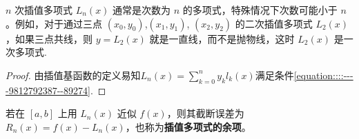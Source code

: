 \documentclass[../../main.tex]{subfiles}
\begin{document}
\begin{remark}
$n$ 次插值多项式 $L_n(x)$ 通常是次数为 $n$ 的多项式，特殊情况下次数可能小于 $n$。例如，对于通过三点 $(x_0, y_0)$,$ (x_1, y_1)$, $(x_2, y_2)$ 的二次插值多项式 $L_2(x)$，如果三点共线，则 $y = L_2(x)$ 就是一直线，而不是抛物线，这时 $L_2(x)$ 是一次多项式.
\end{remark}
\begin{proof}
由插值基函数的定义易知$L_n(x) = \sum_{k = 0}^n y_k l_k(x)$满足条件\eqref{equation::::----9812792387--89274}.
\end{proof}

\begin{definition}
若在 $[a, b]$ 上用 $L_n(x)$ 近似 $f(x)$，则其截断误差为 $R_n(x) = f(x) - L_n(x)$，也称为\textbf{插值多项式的余项}。
\end{definition}
\end{document}
